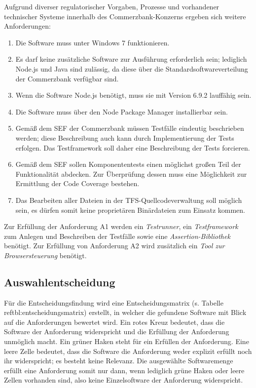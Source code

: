 \newpage
Aufgrund diverser regulatorischer Vorgaben, Prozesse und vorhandener technischer Systeme innerhalb des Commerzbank-Konzerns ergeben sich weitere Anforderungen:
\begin{enumerate}[label=\textbf{CB\arabic*}]
	\item Die Software muss unter Windows 7 funktionieren.
	\item Es darf keine zusätzliche Software zur Ausführung erforderlich sein; lediglich Node.js und Java sind zulässig, da diese über die Standardsoftwareverteilung der Commerzbank verfügbar sind.
	\item Wenn die Software Node.js benötigt, muss sie mit Version 6.9.2 lauffähig sein.
	\item Die Software muss über den Node Package Manager installierbar sein.
	\item Gemäß dem SEF der Commerzbank müssen Testfälle eindeutig beschrieben werden; diese Beschreibung auch kann durch Implementierung der Tests erfolgen\cite{coba-sef}. Das Testframework soll daher eine Beschreibung der Tests forcieren.
	\item Gemäß dem SEF sollen Komponententests \glqq einen möglichst großen Teil der Funktionalität abdecken\grqq{}\cite{coba-sef}. Zur Überprüfung dessen muss eine Möglichkeit zur Ermittlung der Code Coverage bestehen.
	\item Das Bearbeiten aller Dateien in der TFS-Quellcodeverwaltung soll möglich sein, es dürfen somit keine proprietären Binärdateien zum Einsatz kommen.
\end{enumerate}

Zur Erfüllung der Anforderung A1 werden ein \textit{Testrunner}, ein \textit{Testframework} zum Anlegen und Beschreiben der Testfälle sowie eine \textit{Assertion-Bibliothek} benötigt. Zur Erfüllung von Anforderung A2 wird zusätzlich ein \textit{Tool zur Browsersteuerung} benötigt.

\newpage


\newpage
\subsection{Auswahlentscheidung}
\label{sec:auswahlentscheidung}
Für die Entscheidungsfindung wird eine Entscheidungsmatrix (s. Tabelle \\ref{tbl:entscheidungsmatrix}) erstellt, in welcher die gefundene Software mit Blick auf die Anforderungen bewertet wird. Ein rotes Kreuz bedeutet, dass die Software der Anforderung widerspricht und die Erfüllung der Anforderung unmöglich macht. Ein grüner Haken steht für ein Erfüllen der Anforderung. Eine leere Zelle bedeutet, dass die Software die Anforderung weder explizit erfüllt noch ihr widerspricht; es besteht keine Relevanz. Die ausgewählte Softwaremenge erfüllt eine Anforderung somit nur dann, wenn lediglich grüne Haken oder leere Zellen vorhanden sind, also keine Einzelsoftware der Anforderung widerspricht.

